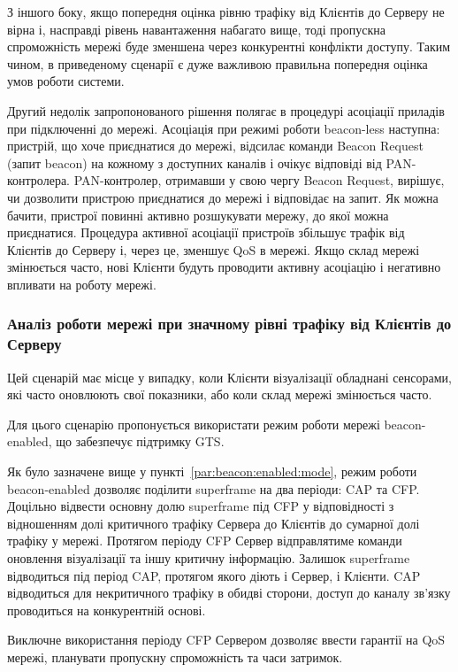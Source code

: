 \documentclass[a4paper,ukrainian,utf8,nocolumnsxix,nocolumnxxxii,nocolumnxxxi,floatsection,equationsection]{eskdtext}
\renewcommand\paragraph{\subsubsection}
\newcommand{\blm}[0]{beacon-less\xspace}
\newcommand{\bem}[0]{beacon-enabled\xspace}
\begin{document}
З іншого боку, якщо попередня оцінка рівню трафіку від Клієнтів до Серверу не вірна і, насправді рівень навантаження набагато вище, тоді пропускна спроможність мережі буде зменшена через конкурентні конфлікти доступу. Таким чином, в приведеному сценарії є дуже важливою правильна попередня оцінка умов роботи системи.

Другий недолік запропонованого рішення полягає в процедурі асоціації приладів при підключенні до мережі. Асоціація при режимі роботи \blm наступна: пристрій, що хоче приєднатися до мережі, відсилає команди Beacon Request (запит beacon) на кожному з доступних каналів і очікує відповіді від PAN-контролера. PAN-контролер, отримавши  у свою чергу Beacon Request, вирішує, чи дозволити пристрою приєднатися до мережі і відповідає на запит. Як можна бачити, пристрої повинні активно розшукувати мережу, до якої можна приєднатися. Процедура активної асоціації пристроїв збільшує трафік від Клієнтів до Серверу і, через це, зменшує QoS в мережі. Якщо склад мережі змінюється часто, нові Клієнти будуть проводити активну асоціацію і негативно впливати на роботу мережі.

\paragraph{Аналіз роботи мережі при значному рівні трафіку від Клієнтів до Серверу}
\label{par:high:ntht}

Цей сценарій має місце у випадку, коли Клієнти візуалізації обладнані сенсорами, які часто  оновлюють свої показники, або коли склад мережі змінюється часто.

Для цього сценарію пропонується використати режим роботи мережі \bem, що забезпечує підтримку GTS.

Як було зазначене вище у пункті~\ref{par:beacon:enabled:mode}, режим роботи \bem дозволяє поділити superframe на два періоди: CAP та CFP. Доцільно відвести основну долю superframe під CFP у відповідності з відношенням долі критичного трафіку Сервера до Клієнтів до сумарної долі трафіку у мережі. Протягом періоду CFP Сервер відправлятиме команди оновлення візуалізації та іншу критичну інформацію. Залишок superframe відводиться під період CAP, протягом якого діють і Сервер, і Клієнти. CAP відводиться для некритичного трафіку в обидві сторони, доступ до каналу зв'язку проводиться на конкурентній основі. 

Виключне використання періоду CFP Сервером дозволяє ввести гарантії на QoS мережі, планувати пропускну спроможність та часи затримок. 
\end{document}

